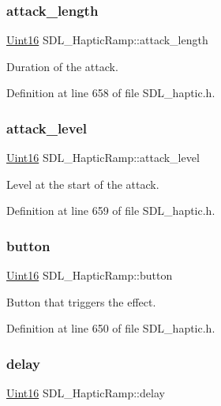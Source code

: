 \subsubsection{\texorpdfstring{attack\_length}{attack\_length}}
{\footnotesize\ttfamily \mbox{\hyperlink{_s_d_l__stdinc_8h_a31fcc0a076c9068668173ee26d33e42b}{Uint16}} S\+D\+L\+\_\+\+Haptic\+Ramp\+::attack\+\_\+length}

Duration of the attack. 

Definition at line 658 of file S\+D\+L\+\_\+haptic.\+h.

\mbox{\label{struct_s_d_l___haptic_ramp_a755933bbda14ae9b53c574b9fe6291a0}} 
\subsubsection{\texorpdfstring{attack\_level}{attack\_level}}
{\footnotesize\ttfamily \mbox{\hyperlink{_s_d_l__stdinc_8h_a31fcc0a076c9068668173ee26d33e42b}{Uint16}} S\+D\+L\+\_\+\+Haptic\+Ramp\+::attack\+\_\+level}

Level at the start of the attack. 

Definition at line 659 of file S\+D\+L\+\_\+haptic.\+h.

\mbox{\label{struct_s_d_l___haptic_ramp_a2027c6fd88f1ebe652c90c71410ee0bf}} 
\subsubsection{\texorpdfstring{button}{button}}
{\footnotesize\ttfamily \mbox{\hyperlink{_s_d_l__stdinc_8h_a31fcc0a076c9068668173ee26d33e42b}{Uint16}} S\+D\+L\+\_\+\+Haptic\+Ramp\+::button}

Button that triggers the effect. 

Definition at line 650 of file S\+D\+L\+\_\+haptic.\+h.

\mbox{\label{struct_s_d_l___haptic_ramp_ac9471016f41919b4a1c786bbd649a777}} 
\subsubsection{\texorpdfstring{delay}{delay}}
{\footnotesize\ttfamily \mbox{\hyperlink{_s_d_l__stdinc_8h_a31fcc0a076c9068668173ee26d33e42b}{Uint16}} S\+D\+L\+\_\+\+Haptic\+Ramp\+::delay}

